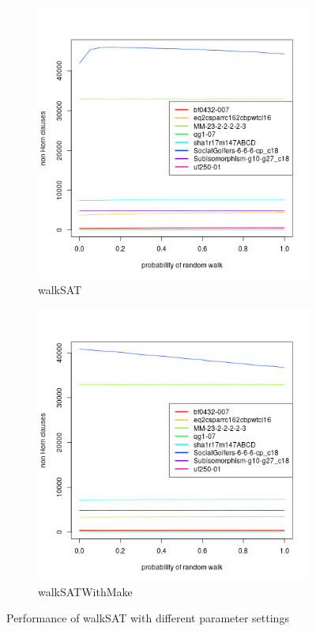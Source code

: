 \documentclass[12pt,a4paper]{article}
\begin{document}
\begin{figure}
  \centering
  \begin{subfigure}{0.45\textwidth}
        \includegraphics[width=\textwidth]{walkSAT/walkSATexperiment[SKIP=0].png}
    \caption{walkSAT}
  \end{subfigure}
  \begin{subfigure}{0.45\textwidth}
  \includegraphics[width=\textwidth]{walkSAT/WalkSATWithMakeexperiment[SKIP=0].png}
  \caption{walkSATWithMake}
\end{subfigure}
  \caption{Performance of walkSAT with different parameter settings}
  \label{fig:walkSAT_exp}
\end{figure}
\end{document}
